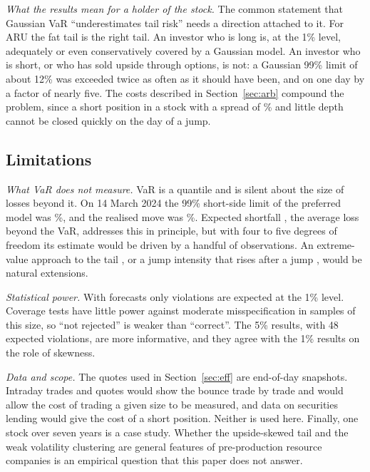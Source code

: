 \documentclass[11pt,a4paper]{article}
\begin{document}
\emph{What the results mean for a holder of the stock.} The common statement that Gaussian VaR ``underestimates tail risk'' needs a direction attached to it. For ARU the fat tail is the right tail. An investor who is long is, at the 1\% level, adequately or even conservatively covered by a Gaussian model. An investor who is short, or who has sold upside through options, is not: a Gaussian 99\% limit of about 12\% was exceeded twice as often as it should have been, and on one day by a factor of nearly five. The costs described in Section~\ref{sec:arb} compound the problem, since a short position in a stock with a spread of \qSpread\% and little depth cannot be closed quickly on the day of a jump.

\subsection{Limitations}

\emph{What VaR does not measure.} VaR is a quantile and is silent about the size of losses beyond it. On 14 March 2024 the 99\% short-side limit of the preferred model was \esJumpLimit\%, and the realised move was \jumpLog\%. Expected shortfall \citep{artzner1999}, the average loss beyond the VaR, addresses this in principle, but with four to five degrees of freedom its estimate would be driven by a handful of observations. An extreme-value approach to the tail \citep{mcneilfrey2000}, or a jump intensity that rises after a jump \citep{maheumccurdy2004}, would be natural extensions.

\emph{Statistical power.} With \oosN{} forecasts only \oosExpOne{} violations are expected at the 1\% level. Coverage tests have little power against moderate misspecification in samples of this size, so ``not rejected'' is weaker than ``correct''. The 5\% results, with 48 expected violations, are more informative, and they agree with the 1\% results on the role of skewness.

\emph{Data and scope.} The quotes used in Section~\ref{sec:eff} are end-of-day snapshots. Intraday trades and quotes would show the bounce trade by trade and would allow the cost of trading a given size to be measured, and data on securities lending would give the cost of a short position. Neither is used here. Finally, one stock over seven years is a case study. Whether the upside-skewed tail and the weak volatility clustering are general features of pre-production resource companies is an empirical question that this paper does not answer.
\end{document}
